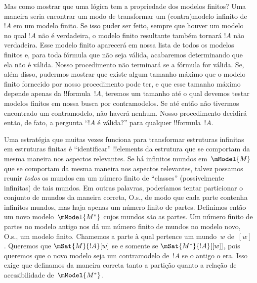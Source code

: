 \documentclass[../../../include/open-logic-section]{subfiles}
\begin{document}
Mas como mostrar que uma lógica tem a propriedade dos modelos finitos?
Uma maneira seria encontrar um modo de transformar um (contra)modelo
infinito de~$!A$ em um modelo finito. Se isso puder ser feito, sempre
que houver um modelo no qual $!A$ não é verdadeira, o modelo finito
resultante também tornará $!A$ não verdadeira. Esse modelo finito
aparecerá em nossa lista de todos os modelos finitos e, para toda
fórmula que não seja válida, acabaremos determinando que ela não é
válida. Nosso procedimento não terminará se a fórmula for válida. Se,
além disso, pudermos mostrar que existe algum tamanho máximo que o
modelo finito fornecido por nosso procedimento pode ter, e que esse
tamanho máximo depende apenas da !!{formula}~$!A$, teremos um tamanho
até o qual devemos testar modelos finitos em nossa busca por
contramodelos. Se até então não tivermos encontrado um contramodelo,
não haverá nenhum. Nosso procedimento decidirá então, de fato, a
pergunta ``$!A$ é válida?'' para qualquer !!{formula}~$!A$.

Uma estratégia que muitas vezes funciona para transformar estruturas
infinitas em estruturas finitas é ``identificar'' !!{element}s da
estrutura que se comportam da mesma maneira nos aspectos relevantes.
Se há infinitos mundos em~$\mModel{M}$ que se comportam da mesma
maneira nos aspectos relevantes, talvez possamos reunir \emph{todos}
os mundos em um número finito de ``classes'' (possivelmente infinitas)
de tais mundos. Em outras palavras, poderíamos tentar particionar o conjunto de
mundos da maneira correta, O.s.\@, de modo que cada parte contenha
infinitos mundos, mas haja apenas um número finito de partes. Definimos
então um novo modelo~$\mModel{M^*}$ cujos mundos são as partes. Um
número finito de partes no modelo antigo nos dá um número finito de
mundos no modelo novo, O.s.\@, um modelo finito. Chamemos a
parte à qual pertence um mundo~$w$ de~$[w]$. Queremos que
$\mSat{M}{!A}[w]$ se e somente se $\mSat{M^*}{!A}[{[w]}]$, pois
queremos que o novo modelo seja um contramodelo de~$!A$ se o antigo o
era. Isso exige que definamos da maneira correta tanto a partição
quanto a relação de acessibilidade de~$\mModel{M^*}$.
\end{document}
